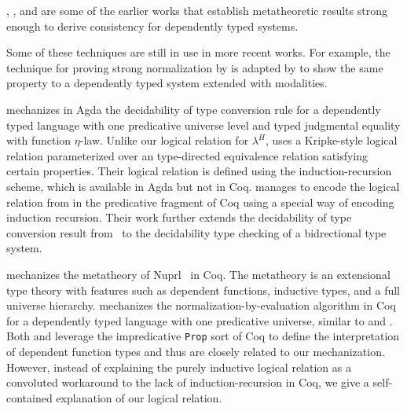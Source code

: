 \documentclass[acmsmall,screen=true,
\ifpublic review=false\else,review=true\fi
  ,anonymous=\ifanonymous true\else false\fi]{acmart}
\newcommand{\lang}{$\lambda^H$\xspace}
\newcommand{\scw}[1]{}
\begin{document}
\citet{Martin-Lof-1973}, \citet{geuvers1994short}, and
\citet{barendregt:lambda-calculi-with-types} are some of the earlier
works that establish metatheoretic results strong enough to derive
consistency for dependently typed systems.
\scw{Should give Martin L\"of credit for first consistency proof.}
\scw{What techniques do these three proofs use? How is it different from
your proof? What about Luo, which
introduced a universe hierarchy? What about categories with families, or
other ways of showing consistency?}
Some of these techniques
are still in use in more recent works. For example, the technique for
proving strong normalization by \citet{geuvers1994short} is adapted by
\citet{moon2021graded} to show the same property to a dependently
typed system extended with modalities.

\citet{decagda} mechanizes in Agda the decidability of type
conversion rule for a dependently typed language with one predicative
universe level and typed judgmental equality with function
$\eta$-law. Unlike our logical relation for \lang{}, \citet{decagda}
uses a Kripke-style logical relation parameterized over an
type-directed equivalence relation satisfying certain
properties. Their logical relation is defined using the
induction-recursion scheme, which is available in Agda but not in Coq.
\citet{martin-lof-a-la-coq} manages to encode the logical relation
from \citet{decagda} in the predicative fragment of Coq using a
special way of encoding induction recursion. Their work further
extends the decidability of type conversion result from~\citet{decagda} to the decidability
type checking of a bidrectional type system.

\citet{anand2014towards} mechanizes the metatheory of
Nuprl~\citep{constable1986implementing} in Coq. The metatheory is an
extensional type theory with features such as dependent functions,
inductive types, and a full universe hierarchy. \citet{nbeincoq}
mechanizes the normalization-by-evaluation algorithm in Coq for a
dependently typed language with one predicative universe, similar to
\citet{decagda} and \citet{martin-lof-a-la-coq}. Both
\citet{anand2014towards} and \citet{nbeincoq} leverage the
impredicative \texttt{Prop} sort of Coq to define the interpretation
of dependent function types and thus are closely related to our
mechanization. However, instead of explaining the purely inductive
logical relation as a convoluted workaround to the lack of
induction-recursion in Coq, we give a self-contained explanation of
our logical relation.
\end{document}
